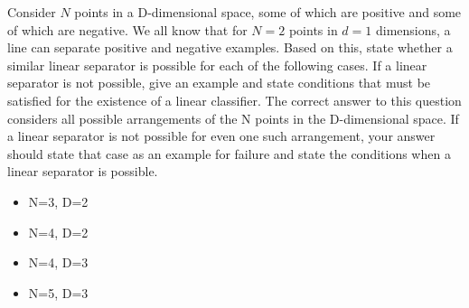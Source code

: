 \documentclass[fontsize=10pt,DIV=14]{scrartcl}
\begin{document}
	Consider $N$ points in a D-dimensional space, some of which are positive and some of which are negative. We all know that for $N = 2$ points in $d = 1$ dimensions, a line can separate positive and negative examples. Based on this, state whether a similar linear separator is possible for each of the following cases. If a linear separator is not possible, give an example and state conditions that must be satisﬁed for the existence of a linear classiﬁer. The correct answer to this question considers all possible arrangements of the N points in the D-dimensional space. If a linear separator is not possible for even one such arrangement, your answer should state that case as an example for failure and state the conditions when a linear separator is possible.
	\begin{itemize}
		\item
		N=3, D=2

		\item
		N=4, D=2

		\item
		N=4, D=3

		\item
		N=5, D=3
	\end{itemize}
\end{document}
